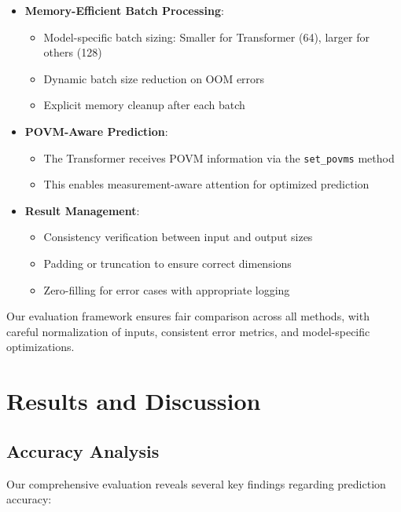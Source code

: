 \documentclass{optica-article}
\begin{document}
\begin{itemize}
\item \textbf{Memory-Efficient Batch Processing}:
\begin{itemize}
\item Model-specific batch sizing: Smaller for Transformer (64), larger for others (128)
\item Dynamic batch size reduction on OOM errors
\item Explicit memory cleanup after each batch
\end{itemize}

\item \textbf{POVM-Aware Prediction}:
\begin{itemize}
\item The Transformer receives POVM information via the \texttt{set\_povms} method
\item This enables measurement-aware attention for optimized prediction
\end{itemize}

\item \textbf{Result Management}:
\begin{itemize}
\item Consistency verification between input and output sizes
\item Padding or truncation to ensure correct dimensions
\item Zero-filling for error cases with appropriate logging
\end{itemize}
\end{itemize}

Our evaluation framework ensures fair comparison across all methods, with careful normalization of inputs, consistent error metrics, and model-specific optimizations.

\section{Results and Discussion}

\subsection{Accuracy Analysis}

Our comprehensive evaluation reveals several key findings regarding prediction accuracy:
\end{document}
